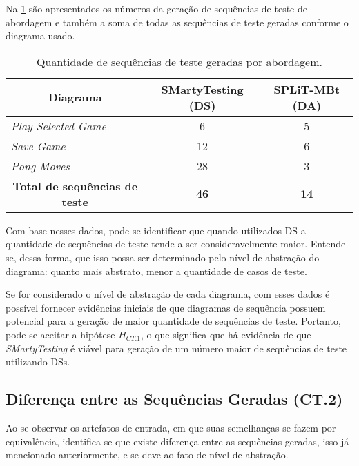 
Na \ref{tab:comparacaoDSxDA} são apresentados os números da geração de sequências de teste de abordagem e também a soma de todas as sequências de teste geradas conforme o diagrama usado.

\begin{table}[H]
	\centering
	\caption{Quantidade de sequências de teste geradas por abordagem.}
	\label{tab:comparacaoDSxDA}
	\begin{tabular}{l|c|c}
		\hline
		\multicolumn{1}{c|}{\textbf{Diagrama}} & \textbf{SMartyTesting (DS)} & \textbf{SPLiT-MBt (DA)} \\ \hline
		\textit{Play Selected Game} & 6 & 5 \\ \hline
		\textit{Save Game} & 12 & 6 \\ \hline
		\textit{Pong Moves} & 28 & 3 \\ \hline
		\multicolumn{1}{c|}{\textbf{Total de sequências de teste}} & \textbf{46} & \textbf{14} \\ \hline
	\end{tabular}
\end{table}

Com base nesses dados, pode-se identificar que quando utilizados DS a quantidade de sequências de teste tende a ser consideravelmente maior. Entende-se, dessa forma, que isso possa ser determinado pelo nível de abstração do diagrama: quanto mais abstrato, menor a quantidade de casos de teste.

Se for considerado o nível de abstração de cada diagrama, com esses dados é possível fornecer evidências iniciais de que diagramas de sequência possuem potencial para a geração de maior quantidade de sequências de teste. Portanto, pode-se aceitar a hipótese $H_{CT.1}$, o que significa que há evidência de que \textit{SMartyTesting} é viável para geração de um número maior de sequências de teste utilizando DSs.

\subsection{Diferença entre as Sequências Geradas (CT.2)}
Ao se observar os artefatos de entrada, em que suas semelhanças se fazem por equivalência, identifica-se que existe diferença entre as sequências geradas, isso já mencionado anteriormente, e se deve ao fato de nível de abstração.

